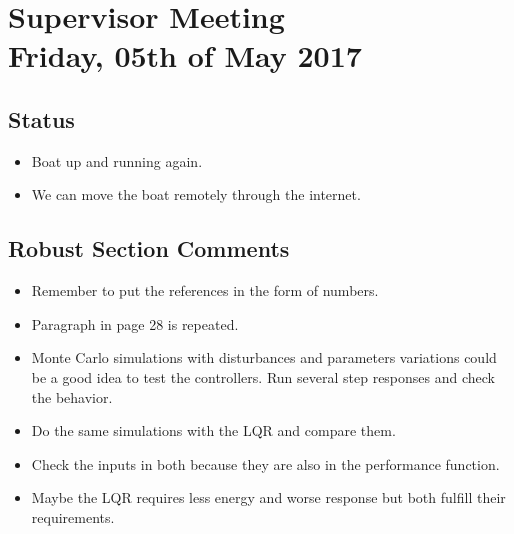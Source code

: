 
\renewcommand{\vec}[1]{\boldsymbol{\mathbf{#1}}}


\section*{Supervisor Meeting\\ \small Friday, 05th of May 2017}

\subsection{Status}
\begin{itemize}
    \item Boat up and running again.
    \item We can move the boat remotely through the internet.     
\end{itemize}
\subsection{Robust Section Comments}
\begin{itemize}
	\item Remember to put the references in the form of numbers.
    \item Paragraph in page 28 is repeated.
    \item Monte Carlo simulations with disturbances and parameters variations could be a good idea to test the controllers. Run several step responses and check the behavior.
    \item Do the same simulations with the LQR and compare them.
    \item Check the inputs in both because they are also in the performance function.
    \item Maybe the LQR requires less energy and worse response but both fulfill their requirements.
\end{itemize}	
